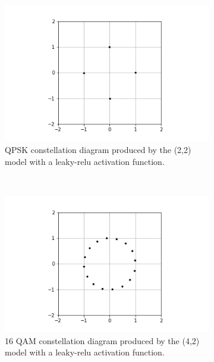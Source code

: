 \documentclass[12pt,onecolumn,letterpaper]{article}
\begin{document}
\begin{figure}[t]
   \centering
   \begin{subfigure}[t]{0.4\textwidth}
       \centering
       \includegraphics[width=\linewidth]{figures/leaky_relu_qpsk_constellation_diagram.png}
       \caption{QPSK constellation diagram produced by the (2,2) model with a leaky-relu activation function.}
   \end{subfigure}
   ~
   \begin{subfigure}[t]{0.4\textwidth}
       \centering
       \includegraphics[width=\linewidth]{figures/leaky_relu_16_QAM_constellation_diagram.png}
       \caption{16 QAM constellation diagram produced by the (4,2) model with a leaky-relu activation function.}
   \end{subfigure}
   \caption{}
   \label{fig:Lr22ConstDiags}
\end{figure}
\end{document}
